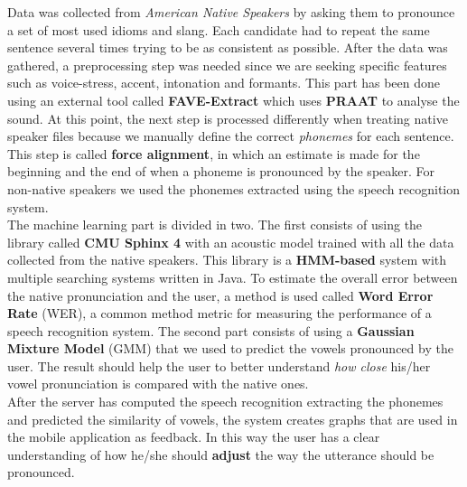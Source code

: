 \noindent Data was collected from \textit{American Native Speakers} by asking them to pronounce a set of most used idioms and slang. Each candidate had to repeat the same sentence several times trying to be as consistent as possible. After the data was gathered, a preprocessing step was needed since we are seeking specific features such as voice-stress, accent, intonation and formants.
This part has been done using an external tool called \textbf{FAVE-Extract} which uses \textbf{PRAAT}\cite{boersma2010p} to analyse the sound. At this point, the next step is processed differently when treating native speaker files because we manually define the correct \textit{phonemes} for each sentence. This step is called \textbf{force alignment}, in which an estimate is made for the beginning and the end of when a phoneme is pronounced by the speaker. For non-native speakers we used the phonemes extracted using the speech recognition system. \\

\noindent The machine learning part is divided in two. The first consists of using the library called \textbf{CMU Sphinx 4} with an acoustic model trained with all the data collected from the native speakers. This library is a \textbf{HMM-based} system with multiple searching systems written in Java. To estimate the overall error between the native pronunciation and the user, a method is used called \textbf{Word Error Rate} (WER), a common method metric for measuring the performance of a speech recognition system.
The second part consists of using a \textbf{Gaussian Mixture Model} (GMM) that we used to predict the vowels pronounced by the user. The result should help the user to better understand \textit{how close} his/her vowel pronunciation is compared with the native ones. \\

\noindent After the server has computed the speech recognition extracting the phonemes and predicted the similarity of vowels, the system creates graphs that are used in the mobile application as feedback. In this way the user has a clear understanding of how he/she should \textbf{adjust} the way the utterance should be pronounced. \\
